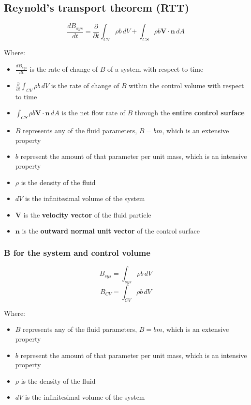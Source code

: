 \documentclass[11pt]{article}
\begin{document}
\subsection{Reynold's transport theorem (RTT)}
\label{sec:org367e0b2}
\[\frac{dB_{sys}}{dt} = \frac{\partial}{\partial t} \int_{CV} \rho b \, dV + \int_{CS} \rho b \boldsymbol{V} \cdot \boldsymbol{n} \, dA\]

Where:
\begin{itemize}
\item \(\frac{dB_{sys}}{dt}\) is the rate of change of \(B\) of a system with respect to time
\item \(\frac{\partial}{\partial t} \int_{CV} \rho b \, dV\) is the rate of change of \(B\) within the control volume with respect to time
\item \(\int_{CS} \rho b \boldsymbol{V} \cdot \boldsymbol{n} \, dA\) is the net flow rate of \(B\) through the \textbf{entire control surface}
\item \(B\) represents any of the fluid parameters, \(B = bm\), which is an extensive property
\item \(b\) represent the amount of that parameter per unit mass, which is an intensive property
\item \(\rho\) is the density of the fluid
\item \(dV\) is the infinitesimal volume of the system
\item \(\boldsymbol{V}\) is the \textbf{velocity vector} of the fluid particle
\item \(\boldsymbol{n}\) is the \textbf{outward normal unit vector} of the control surface
\end{itemize}

\subsubsection{B for the system and control volume}
\label{sec:orgd018ab6}
\[B_{sys} = \int_{sys} \rho b \, dV\]
\[B_{CV} = \int_{CV} \rho b \, dV\]

Where:
\begin{itemize}
\item \(B\) represents any of the fluid parameters, \(B = bm\), which is an extensive property
\item \(b\) represent the amount of that parameter per unit mass, which is an intensive property
\item \(\rho\) is the density of the fluid
\item \(dV\) is the infinitesimal volume of the system
\end{itemize}
\end{document}
